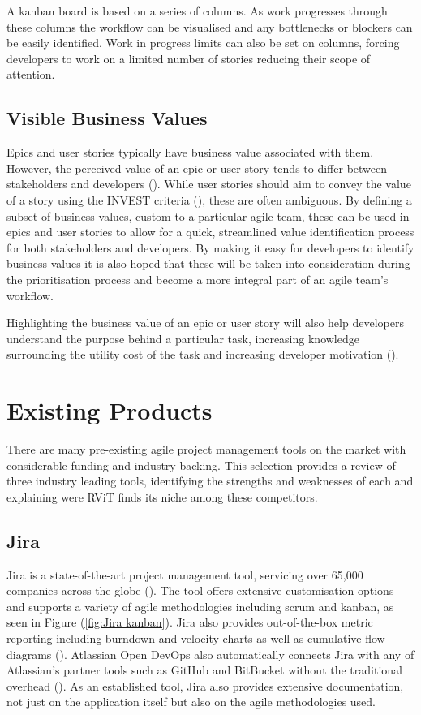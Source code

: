 \documentclass[l4proj.tex]{subfiles}
\begin{document}
A kanban board is based on a series of columns. As work progresses through these columns the workflow can be visualised and any bottlenecks or blockers can be easily identified. Work in progress limits can also be set on columns, forcing developers to work on a limited number of stories reducing their scope of attention.


\subsection{Visible Business Values}

Epics and user stories typically have business value associated with them. However, the perceived value of an epic or user story tends to differ between stakeholders and developers (\cite{Gregory2020}). While user stories should aim to convey the value of a story using the INVEST criteria (\cite{Buglione2013}), these are often ambiguous. By defining a subset of business values, custom to a particular agile team, these can be used in epics and user stories to allow for a quick, streamlined value identification process for both stakeholders and developers. By making it easy for developers to identify business values it is also hoped that these will be taken into consideration during the prioritisation process and become a more integral part of an agile team's workflow. 

Highlighting the business value of an epic or user story will also help developers understand the purpose behind a particular task, increasing knowledge surrounding the utility cost of the task and increasing developer motivation (\cite{Wigfield2000}). 

\section{Existing Products}
There are many pre-existing agile project management tools on the market with considerable funding and industry backing. This selection provides a review of three industry leading tools, identifying the strengths and weaknesses of each and explaining were RViT finds its niche among these competitors.


\subsection{Jira}
Jira is a state-of-the-art project management tool, servicing over 65,000 companies across the globe (\cite{JiraUsers}). The tool offers extensive customisation options and supports a variety of agile methodologies including scrum and kanban, as seen in Figure (\ref{fig:Jira kanban}).
Jira also provides out-of-the-box metric reporting including burndown and velocity charts as well as cumulative flow diagrams (\cite{JiraReports}). Atlassian Open DevOps also automatically connects Jira with any of Atlassian's partner tools such as GitHub and BitBucket without the traditional overhead (\cite{JiraDevOps}). As an established tool, Jira also provides extensive documentation, not just on the application itself but also on the agile methodologies used.
\end{document}
